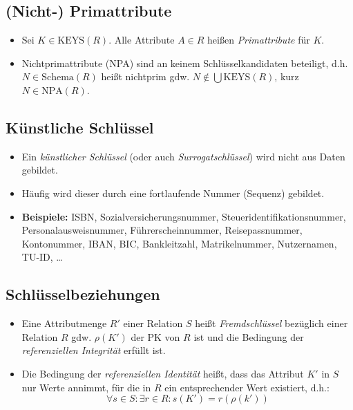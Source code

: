 \documentclass[a4paper, 11pt, accentcolor = tud3b]{tudreport}
\newcommand{\Schema}{\text{Schema}}
\newcommand{\KEYS}{\text{KEYS}}
\begin{document}
            \subsection{(Nicht-) Primattribute} %
                \begin{itemize}
                	\item Sei \( K \in \KEYS(R) \). Alle Attribute \( A \in R \) heißen \textit{Primattribute} für \(K\).
                	\item Nichtprimattribute (NPA) sind an keinem Schlüsselkandidaten beteiligt, d.h. \( N \in \Schema(R) \) heißt nichtprim gdw. \( N \not\in \bigcup \KEYS(R) \), kurz \( N \in \text{NPA}(R) \).
                \end{itemize}

            \subsection{Künstliche Schlüssel} %
                \begin{itemize}
                	\item Ein \textit{künstlicher Schlüssel} (oder auch \textit{Surrogatschlüssel}) wird nicht aus Daten gebildet.
                	\item Häufig wird dieser durch eine fortlaufende Nummer (Sequenz) gebildet.
                	\item \textbf{Beispiele:} ISBN, Sozialversicherungsnummer, Steueridentifikationsnummer, Personalausweisnummer, Führerscheinnummer, Reisepassnummer, Kontonummer, IBAN, BIC, Bankleitzahl, Matrikelnummer, Nutzernamen, TU-ID, \dots
                \end{itemize}

            \subsection{Schlüsselbeziehungen} %
                \begin{itemize}
                	\item Eine Attributmenge \(R'\) einer Relation \(S\) heißt \textit{Fremdschlüssel} bezüglich einer Relation \(R\) gdw. \( \rho(K') \) der PK von \(R\) ist und die Bedingung der \textit{referenziellen Integrität} erfüllt ist.
                	\item Die Bedingung der \textit{referenziellen Identität} heißt, dass das Attribut \(K'\) in \(S\) nur Werte annimmt, für die in \(R\) ein entsprechender Wert existiert, d.h.:
                		\begin{equation*}
	                		\forall s \in S : \exists r \in R : s(K') = r(\rho(k'))
                		\end{equation*}
                \end{itemize}
\end{document}
